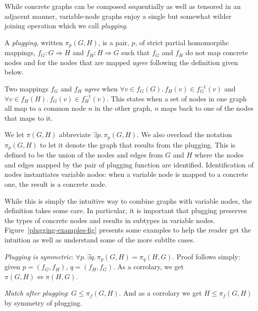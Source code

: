 \documentclass[runningheads]{llncs}
\begin{document}
While concrete graphs can be composed sequentially as well as tensored
in an adjacent manner, variable-node graphs enjoy a single but
somewhat wilder joining operation which we call \emph{plugging}. 

\begin{definition}
  A \emph{plugging}, written $\pi_{p}(G,H)$, is a pair, $p$, of
  strict partial homomorpihc mappings, $f_G : G \Longrightarrow H$ and
  $f_H : H \Longrightarrow G$ such that $f_G$ and $f_H$ do not map
  concrete nodes and for the nodes that are mapped \emph{agree}
  following the definition given below.
\end{definition}

\begin{definition}
  Two mappings $f_G$ and $f_H$ \emph{agree} when $\forall v \in
  f_G(G).\, f_H(v) \in f^{-1}_G(v)$ and $\forall v \in f_H(H).\,
  f_G(v) \in f^{-1}_H(v)$. This states when a set of nodes in one
  graph all map to a common node $n$ in the other graph, $n$ maps back
  to one of the nodes that maps to it. 
\end{definition}

We let $\pi(G,H)$ abbreviate $\exists p.\,\pi_p(G,H)$. We also
overload the notation $\pi_p(G,H)$ to let it denote the graph that
results from the plugging. This is defined to be the union of the
nodes and edges from $G$ and $H$ where the nodes and edges mapped by
the pair of plugging function are identified. Identification of nodes
instantiates variable nodes: when a variable node is mapped to a
concrete one, the result is a concrete node.

While this is simply the intuitive way to combine graphs with variable
nodes, the definition takes some care. In particular, it is important
that plugging preserves the types of concrete nodes and results in
subtypes in variable nodes. Figure~\ref{plugging-examples-fig}
presents some examples to help the reader get the intuition as well as
understand some of the more subtlte cases.

\begin{theorem}
  \emph{Plugging is symmetric}: $\forall p.\, \exists q.\, \pi_p(G,H)
  = \pi_q(H,G)$. Proof follows simply: given $p = (f_G,f_H)$, $q =
  (f_H,f_G)$. As a corrolary, we get $\pi(G,H) \Leftrightarrow
  \pi(H,G)$.
\end{theorem}

\begin{theorem}
  \emph{Match after plugging}: $G \leq \pi_f(G,H)$. And as a corrolary
  we get $H \leq \pi_f(G,H)$ by symmetry of plugging. 
\end{theorem}
\end{document}
